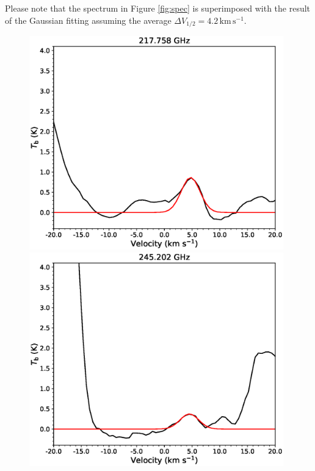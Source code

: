 Please note that the spectrum in Figure \ref{fig:spec} is superimposed with the result of the Gaussian fitting 
assuming the average $\Delta V_{1/2} = 4.2\, \mathrm{km\,s^{-1}}$.

\begin{figure}[H] 
\begin{center}
\begin{minipage}{0.98\textwidth} 
\begin{center}
\begin{minipage}{0.48\textwidth}
\begin{center}
\includegraphics[width=0.98\textwidth]{OrionKL/spectrum/HC/217.758328w_fit.eps}
\end{center}
\end{minipage}
\begin{minipage}{0.48\textwidth}
\begin{center}
\includegraphics[width=0.98\textwidth]{OrionKL/spectrum/HC/245.2021362w_fit.eps}

\end{center}
\end{minipage}
\end{center}
\end{minipage}
\end{center}
\end{figure}
